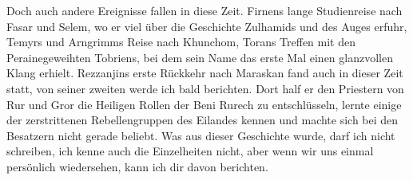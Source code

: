 Doch auch andere Ereignisse fallen in diese Zeit. Firnens lange Studienreise nach Fasar und Selem, wo er viel über die Geschichte Zulhamids und des Auges erfuhr, Temyrs und Arngrimms Reise nach Khunchom, Torans Treffen mit den Perainegeweihten Tobriens, bei dem sein Name das erste Mal einen glanzvollen Klang erhielt. Rezzanjins erste Rückkehr nach Maraskan fand auch in dieser Zeit statt, von seiner zweiten werde ich bald berichten. Dort half er den Priestern von Rur und Gror die Heiligen Rollen der Beni Rurech zu entschlüsseln, lernte einige der zerstrittenen Rebellengruppen des Eilandes kennen und machte sich bei den Besatzern nicht gerade beliebt. Was aus dieser Geschichte wurde, darf ich nicht schreiben, ich kenne auch die Einzelheiten nicht, aber wenn wir uns einmal persönlich wiedersehen, kann ich dir davon berichten.
